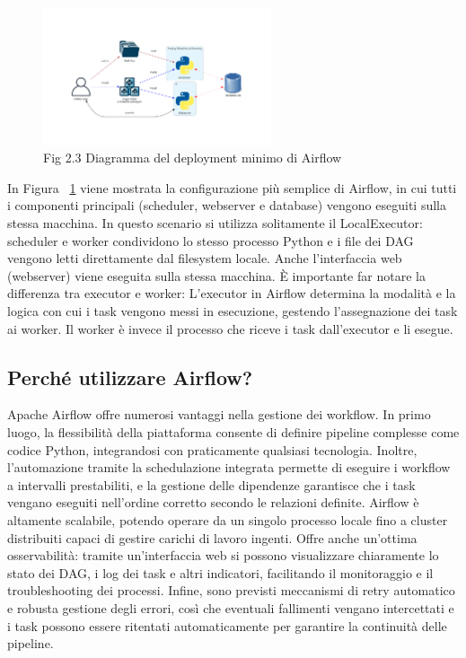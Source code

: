 \begin{figure}[h]
    \centering
    \includegraphics[width=0.6\textwidth]{img/diagram_basic_airflow_architecture.png}
    \caption{Fig 2.3 Diagramma del deployment minimo di Airflow}
    \label{fig:airflow_minimal_deployment}
\end{figure}

In Figura ~\ref{fig:airflow_minimal_deployment} viene mostrata la configurazione più semplice di Airflow, in cui tutti i componenti principali (scheduler, webserver e database) vengono eseguiti sulla stessa macchina. In questo scenario si utilizza solitamente il LocalExecutor: scheduler e worker condividono lo stesso processo Python e i file dei DAG vengono letti direttamente dal filesystem locale. Anche l’interfaccia web (webserver) viene eseguita sulla stessa macchina. È importante far notare la differenza tra executor e worker: 
L’executor in Airflow determina la modalità e la logica con cui i task vengono messi in esecuzione, gestendo l’assegnazione dei task ai worker.
Il worker è invece il processo che riceve i task dall’executor e li esegue.

\subsection{Perché utilizzare Airflow?}
\label{sec:percheairflow}
Apache Airflow offre numerosi vantaggi nella gestione dei workflow. In primo luogo, la flessibilità della piattaforma consente di definire pipeline complesse come codice Python, integrandosi con praticamente qualsiasi tecnologia. Inoltre, l’automazione tramite la schedulazione integrata permette di eseguire i workflow a intervalli prestabiliti, e la gestione delle dipendenze garantisce che i task vengano eseguiti nell’ordine corretto secondo le relazioni definite. Airflow è altamente scalabile, potendo operare da un singolo processo locale fino a cluster distribuiti capaci di gestire carichi di lavoro ingenti. Offre anche un’ottima osservabilità: tramite un’interfaccia web si possono visualizzare chiaramente lo stato dei DAG, i log dei task e altri indicatori, facilitando il monitoraggio e il troubleshooting dei processi. Infine, sono previsti meccanismi di retry automatico e robusta gestione degli errori, così che eventuali fallimenti vengano intercettati e i task possono essere ritentati automaticamente per garantire la continuità delle pipeline.

